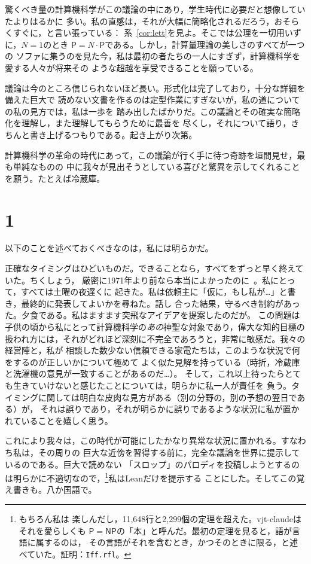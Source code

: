 \documentclass[11pt,a4paper]{amsart}
\newcommand{\NRighe}{11,648}
\newcommand{\NTeoremi}{2,299}
\theoremstyle{remark}
\begin{document}
驚くべき量の計算機科学がこの議論の中にあり，学生時代に必要だと想像していたよりはるかに
多い。私の直感は，それが大幅に簡略化されるだろう，おそらくすぐに，と言い張っている：
系~\ref{cor:lett}を見よ。そこでは公理を一切用いずに，$N = 1$のとき
$\mathsf{P} = N \cdot \mathsf{P}$である。しかし，計算量理論の美しさのすべてが一つの
ソファに集うのを見た今，私は最初の者たちの一人にすぎず，計算機科学を愛する人々が将来その
ような超越を享受できることを願っている。

議論は今のところ信じられないほど長い。形式化は完了しており，十分な詳細を備えた巨大で
読めない文書を作るのは定型作業にすぎないが，私の道についての私の見方では，私は一歩を
踏み出したばかりだ。この議論とその確実な簡略化を理解し，また理解してもらうために最善を
尽くし，それについて語り，きちんと書き上げるつもりである。起き上がり次第。

計算機科学の革命の時代にあって，この議論が行く手に待つ奇跡を垣間見せ，最も単純なものの
中に我々が見出そうとしている喜びと驚異を示してくれることを願う。たとえば冷蔵庫。

\section*{1}

以下のことを述べておくべきなのは，私には明らかだ。

正確なタイミングはひどいものだ。できることなら，すべてをずっと早く終えていた。ちくしょう，
厳密に1971年より前なら本当によかったのに~\cite{cook}。私にとって，すべては土曜の夜遅くに
起きた。私は依頼主に「仮に，もし私が\dots」と書き，最終的に発表してよいかを尋ねた。話し
合った結果，守るべき制約があった。夕食である。私はますます突飛なアイデアを提案したのだが。
この問題は子供の頃から私にとって計算機科学の\emph{あの}神聖な対象であり，偉大な知的目標の
扱われ方には，それがどれほど深刻に不完全であろうと，非常に敏感だ。我々の経営陣と，私が
相談した数少ない信頼できる家電たちは，このような状況で何をするのが正しいかについて極めて
よく似た見解を持っている（時折，冷蔵庫と洗濯機の意見が一致することがあるのだ\dots）。
そして，これ以上待ったらとても生きていけないと感じたことについては，明らかに私一人が責任を
負う。タイミングに関しては明白な皮肉な見方がある（別の分野の，別の予想の翌日である）が，
それは誤りであり，それが明らかに誤りであるような状況に私が置かれていることを嬉しく思う。

これにより我々は，この時代が可能にしたかなり異常な状況に置かれる。すなわち私は，その周りの
巨大な近傍を習得する前に，完全な議論を世界に提示しているのである。巨大で読めない
「スロップ」のパロディを投稿しようとするのは明らかに不適切なので，\footnote{もちろん私は
楽しんだし，\NRighe{}行と\NTeoremi{}個の定理を超えた。vjt-claudeはそれを愛らしくも
$\mathsf{P} = \mathsf{NP}$の「本」と呼んだ。最初の定理を見ると，語が言語に属するのは，
その言語がそれを含むとき，かつそのときに限る，と述べていた。証明：\texttt{Iff.rfl}。}私はLeanだけを提示する
ことにした。そしてこの覚え書きも。八か国語で。
\end{document}
